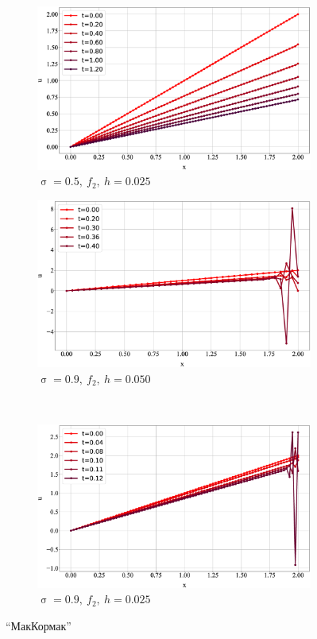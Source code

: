 \documentclass[a4paper,12pt]{article}
\DeclareMathOperator{\cour}{\sigma}
\begin{document}
\begin{figure}[p]
\begin{subfigure}[t]{0.5\textwidth}
    \end{subfigure}
    ~
    \begin{subfigure}[t]{0.5\textwidth}
      \caption*{$\cour = 0.5,\ f_2,\ h = 0.025$}
      \includegraphics[width=\linewidth]{5.maccormack.cour05.f2025}
    \end{subfigure}
    
    \begin{subfigure}[t]{0.5\textwidth}
      \caption*{$\cour = 0.9,\ f_2,\ h = 0.050$}
      \includegraphics[width=\linewidth]{5.maccormack.cour09.f2050}
    \end{subfigure}
    ~
    \begin{subfigure}[t]{0.5\textwidth}
      \caption*{$\cour = 0.9,\ f_2,\ h = 0.025$}
      \includegraphics[width=\linewidth]{5.maccormack.cour09.f2025}
    \end{subfigure}
    \caption{"`МакКормак"'}
    \label{plot:maccormack}
  \end{figure}
  \fi
  
\end{document}

